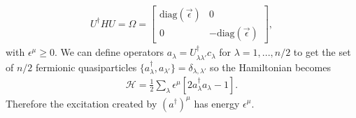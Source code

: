 \documentclass[reprint,amsmath,amssymb,aps,prb,groupedaddress,nofootinbib,superscriptaddress]{revtex4-1}
\newcommand{\1}{\mathds{1}}
\begin{document}
\begin{align}
U^\dag H U = \Omega = \left[\begin{array}{cc}
\text{diag}(\vec{\epsilon}) & 0 \\
0 & -\text{diag}(\vec{\epsilon})
\end{array}\right],
\end{align}
with $\epsilon^\mu \geq 0$.
We can define operators $a_\lambda = U^\dag_{\lambda \lambda'} c_\lambda$ for $\lambda = 1,...,n/2$ to get the set of $n/2$ fermionic quasiparticles \mbox{$\{a^\dagger_\lambda , a_{\lambda'} \}= \delta_{\lambda,\lambda'}$} so the Hamiltonian becomes
\begin{align}\label{Ha}
\mathcal{H} =  \frac{1}{2}\sum_{\lambda}\epsilon^\mu \left[2 a_\lambda^\dagger a_\lambda - 1 \right].
\end{align}
Therefore the excitation created by $(a^\dagger)^\mu$ has energy $\epsilon^\mu$.
\end{document}
